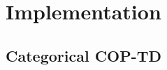 \documentclass[12pt,a4paper,openright,twoside]{article}
\DeclareMathOperator*{\E}{\mathbb{E}}
\numberwithin{equation}{section}
\theoremstyle{definition}
\theoremstyle{remark}
\theoremstyle{plain}
\begin{document}

\newpage

\thispagestyle{plain}
\section{Implementation}

\subsection{Categorical COP-TD}
\end{document}
